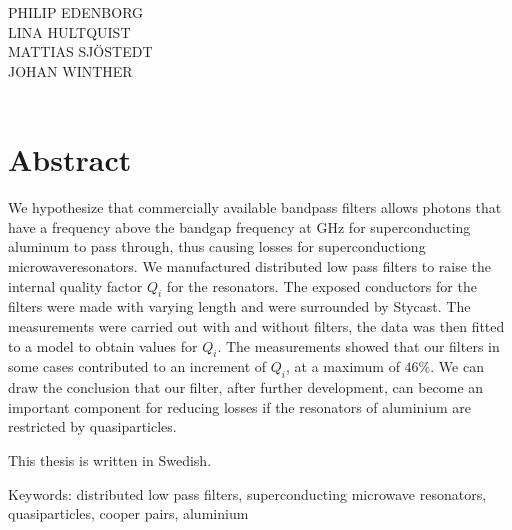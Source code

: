 \documentclass[../../main.tex]{subfiles}
\begin{document}
\titel\\
\undertitel\\
PHILIP EDENBORG\\LINA HULTQUIST\\MATTIAS SJÖSTEDT\\JOHAN WINTHER\\
\department\\
\university \setlength{\parskip}{0.5cm}

\thispagestyle{plain}			%
\setlength{\parskip}{0pt plus 1.0pt}
\section*{Abstract}



We hypothesize that commercially available bandpass filters allows photons that have a frequency above the bandgap frequency at \unit[88]{GHz} for superconducting aluminum to pass through, thus causing losses for superconductiong microwaveresonators. We manufactured distributed low pass filters to raise the internal quality factor $Q_i$ for the resonators. The exposed conductors for the filters were made with varying length and were surrounded by Stycast. The measurements were carried out with and without filters, the data was then fitted to a model to obtain values for $Q_i$. The measurements showed that our filters in some cases contributed to an increment of $Q_i$, at a maximum of $46 \%$. We can draw the conclusion that our filter, after further development, can become an important component for reducing losses if the resonators of aluminium are restricted by quasiparticles.



This thesis is written in Swedish.

\vfill
Keywords: distributed low pass filters, superconducting microwave resonators, quasiparticles, cooper pairs, aluminium
\end{document}
